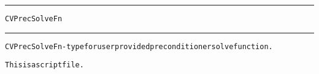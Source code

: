 \begin{samepage}
\hrule
\begin{center}
{\large \verb!CVPrecSolveFn!}
\label{p:CVPrecSolveFn}
\end{center}
\hrule\vspace{0.1in}



\begin{alltt}
CVPrecSolveFn - type for user provided preconditioner solve function.
\end{alltt}

\end{samepage}



\begin{samepage}


\begin{alltt}
This is a script file. 
\end{alltt}

\end{samepage}



